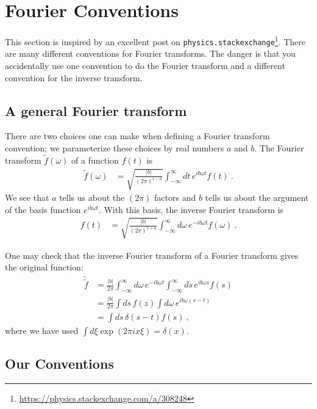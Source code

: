 
\section{Fourier Conventions}
\label{app:Fourier}

This section is inspired by an excellent post on \texttt{physics.stackexchange}\footnote{\url{https://physics.stackexchange.com/a/308248}}. There are many different conventions for Fourier transforms. The danger is that you accidentally use one convention to do the Fourier transform and a different convention for the inverse transform. 

\subsection{A general Fourier transform}

There are two choices one can make when defining a Fourier transform convention; we parameterize these choices by real numbers $a$ and $b$. The Fourier transform $\tilde f(\omega)$ of a function $f(t)$ is
\begin{align}
	\tilde f(\omega)
	&= 
	\sqrt{\frac{|b|}{(2\pi)^{1-a}}}
	\int_{-\infty}^\infty dt\, e^{ib\omega t} f(t) \ .
\end{align}
We see that $a$ tells us about the $(2\pi)$ factors and $b$ tells us about the argument of the basis function $e^{ib\omega t}$. With this basis, the inverse Fourier transform is 
\begin{align}
	f(t)&=
	\sqrt{\frac{|b|}{(2\pi)^{1+a}}}
	\int_{-\infty}^\infty d\omega\, e^{-ib\omega t} f(\omega) \ .
\end{align}

One may check that the inverse Fourier transform of a Fourier transform gives the original function:
\begin{align}
	\tilde{\tilde f} &=
	\frac{|b|}{2\pi}
	\int_{-\infty}^\infty d\omega\, e^{-ib\omega t}
	\int_{-\infty}^{\infty}
	ds\, e^{ib\omega s} f(s)
	\\
	&= 
	\frac{|b|}{2\pi}
	\int ds\, f(z) \int d\omega \, e^{ib\omega(s-t)}
	\\
	&= \int ds\, \delta(s-t) f(s) \ ,
\end{align}
where we have used $\int d\xi \exp(2\pi i x\xi) = \delta(x)$. 

\subsection{Our Conventions}


